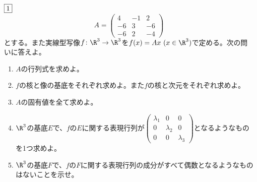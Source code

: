 \begin{tcolorbox} %
    $\fbox{1}$
\begin{equation*}
    A=
    \begin{pmatrix}
        4& -1& 2\\
        -6& 3& -6\\
        -6& 2& -4
    \end{pmatrix}
\end{equation*}
    とする。また実線型写像$f\colon \R^3\to \R^3$を$f(x)= Ax\ (x\in \R^3)$で定める。次の問いに答えよ。
\begin{enumerate}
    \item $A$の行列式を求めよ。
    \item $f$の核と像の基底をそれぞれ求めよ。また$f$の核と次元をそれぞれ求めよ。
    \item $A$の固有値を全て求めよ。
    \item $\R^3$の基底$E$で、$f$の$E$に関する表現行列が$\begin{pmatrix}\lambda_1& 0& 0\\ 0& \lambda_2& 0\\ 0& 0& \lambda_3\end{pmatrix}$となるようなものを1つ求めよ。
    \item $\R^3$の基底$F$で、$f$の$F$に関する表現行列の成分がすべて偶数となるようなものはないことを示せ。
\end{enumerate}
\end{tcolorbox} 

